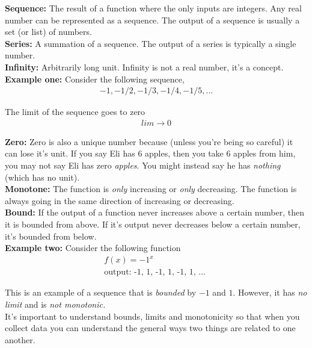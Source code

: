 \documentclass{article}
\begin{document}
\textbf{Sequence:} The result of a function where the only inputs are integers. Any real number can be represented as a sequence. The output of a sequence is usually a set (or list) of numbers. \\

\textbf{Series:} A summation of a sequence. The output of a series is typically a single number. \\

\textbf{Infinity:} Arbitrarily long unit. Infinity is not a real number, it's a concept. \\

\textbf{Example one: } Consider the following sequence, 
\begin{align*}
    -1, -1/2, -1/3, -1/4, -1/5,...
\end{align*}

The limit of the sequence goes to zero 
\begin{align*}
    lim \rightarrow 0
\end{align*}

\textbf{Zero:} Zero is also a unique number because (unless you're being so careful) it can lose it's unit. If you say Eli has 6 apples, then you take 6 apples from him, you may not say Eli has zero \textit{apples}. You might instead say he has \textit{nothing} (which has no unit). \\

\textbf{Monotone:} The function is \textit{only} increasing or \textit{only} decreasing. The function is always going in the same direction of increasing or decreasing. \\

\textbf{Bound:} If the output of a function never increases above a certain number, then it is bounded from above. If it's output never decreases below a certain number, it's bounded from below. \\

\textbf{Example two:} Consider the following function 
\begin{align*}
    f(x) = -1^x\\
    \text{output: -1, 1, -1, 1, -1, 1, ... } 
\end{align*}

This is an example of a sequence that is \textit{bounded} by $-1$ and $1$. However, it has \textit{ no limit} and is \textit{not monotonic.}\\

It's important to understand bounds, limits and monotonicity so that when you collect data you can understand the general ways two things are related to one another. \\
\end{document}
